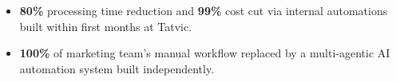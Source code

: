 
\begin{itemize}
  \item \textbf{80\%} processing time reduction and \textbf{99\%} cost cut via internal automations built within first months at Tatvic.
  \item \textbf{100\%} of marketing team's manual workflow replaced by a multi-agentic AI automation system built independently.
\end{itemize}
